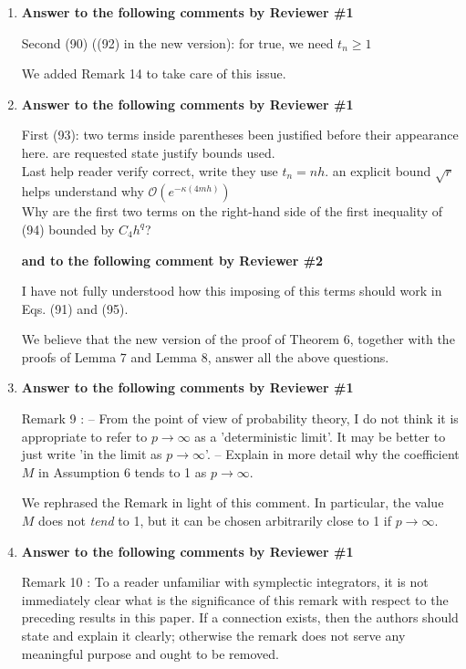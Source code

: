 \documentclass[10pt]{article}
\begin{document}
\begin{enumerate}
	\item \textbf{Answer to the following comments by Reviewer \#1}
	\begin{itquote}
	Second (90) {\normalfont ((92) in the new version)}: for true, we need $t_n\geq 1$
	\end{itquote}
	We added Remark 14 to take care of this issue.
	\item \textbf{Answer to the following comments by Reviewer \#1}
	\begin{itquote}
		First (93): two terms inside parentheses been justified before their appearance here. are requested state justify bounds used. \\ Last help reader verify correct, write they use $t_n=nh$. an explicit bound $\sqrt{r}$ helps understand why $\mathcal O(e^{-\kappa (4mh)})$ \\ Why are the first two terms on the right-hand side of the first inequality of (94) bounded by $C_4 h^q$?
	\end{itquote}
	\textbf{and to the following comment by Reviewer \#2}
	\begin{itquote}
		I have not fully understood how this imposing of this terms should work in Eqs. (91) and (95).
	\end{itquote}
	We believe that the new version of the proof of Theorem 6, together with the proofs of Lemma 7 and Lemma 8, answer all the above questions.
	\item \textbf{Answer to the following comments by Reviewer \#1}
	\begin{itquote}
		Remark 9 {}: -- From the point of view of probability theory, I do not think it is appropriate to refer to $p\to\infty$ as a 'deterministic limit'. It may be better to just write 'in the limit as $p\to\infty$'. -- Explain in more detail why the coefficient $M$ in Assumption 6 tends to 1 as $p\to\infty$.
	\end{itquote}
	We rephrased the Remark in light of this comment. In particular, the value $M$ does not \textit{tend} to 1, but it can be chosen arbitrarily close to 1 if $p \to \infty$.
	\item \textbf{Answer to the following comments by Reviewer \#1}
	\begin{itquote}
		Remark 10 {}: To a reader unfamiliar with symplectic integrators, it is not immediately clear what is the significance of this remark with respect to the preceding results in this paper. If a connection exists, then the authors should state and explain it clearly; otherwise the remark does not serve any meaningful purpose and ought to be removed.

\end{itquote}
\end{enumerate}
\end{document}
